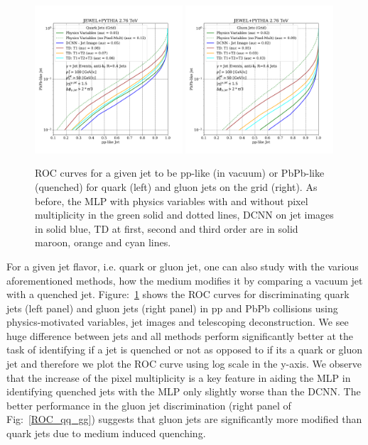 \documentclass[notoc]{JHEP3}
\begin{document}
\begin{figure}[h]
	   \centering
	   \includegraphics[width=0.49\textwidth]{plots/JEWELPYTHIA_2p76TeV_quark_ppvspbpb.pdf}
	   \includegraphics[width=0.49\textwidth]{plots/JEWELPYTHIA_2p76TeV_gluon_ppvspbpb.pdf}
	   \caption{ROC curves for a given jet to be pp-like (in vacuum) or PbPb-like (quenched) for quark (left) and gluon jets on the grid (right). As before, the MLP with physics variables with and without pixel multiplicity in the green solid and dotted lines, DCNN on jet images in solid blue, TD at first, second and third order are in solid maroon, orange and cyan lines.}
\label{fig:ROC_qq_gg}
\end{figure}

For a given jet flavor, i.e. quark or gluon jet, one can also study with the various aforementioned methods, how the medium modifies it by comparing a vacuum jet with a quenched jet. Figure:~\ref{fig:ROC_qq_gg} shows the ROC curves for discriminating quark jets (left panel) and gluon jets (right panel) in pp and PbPb collisions using physics-motivated variables, jet images and telescoping deconstruction. We see huge difference between jets and all methods perform significantly better at the task of identifying if a jet is quenched or not as opposed to if its a quark or gluon jet and therefore we plot the ROC curve using log scale in the y-axis. We observe that the increase of the pixel multiplicity is a key feature in aiding the MLP in identifying quenched jets with the MLP only slightly worse than the DCNN. The better performance in the gluon jet discrimination (right panel of Fig:~\ref{ROC_qq_gg}) suggests that gluon jets are significantly more modified than quark jets due to medium induced quenching. 
\end{document}
